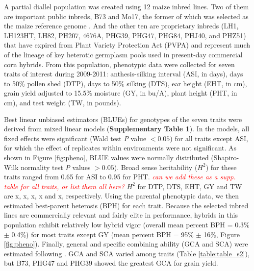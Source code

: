 \documentclass[twoside,twocolumn, letterpaper]{article}
\newcommand{\jri}[1]{\textcolor{red}{ \emph{ #1}} }
\begin{document}
A partial diallel population was created using 12 maize inbred lines. Two of them are important public inbreds, B73 and Mo17, the former of which was selected as the maize reference genome \citep{schnable2009b73}. And the other ten are proprietary inbreds (LH1, LH123HT, LH82, PH207, 4676A, PHG39, PHG47, PHG84, PHJ40, and PHZ51) that have expired from Plant Variety Protection Act (PVPA) \citep{nelson2008molecular} and represent much of the lineage of key heterotic germplasm pools used in present-day commercial corn hybrids.
From this population, phenotypic data were collected for seven traits of interest during 2009-2011: anthesis-silking interval (ASI, in days), days to 50\% pollen shed (DTP), days to 50\% silking (DTS), ear height (EHT, in cm), grain yield adjusted to 15.5\% moisture (GY, in bu/A), plant height (PHT, in cm), and test weight (TW, in pounds).

Best linear unbiased estimators (BLUEs) for genotypes of the seven traits were derived from mixed linear models (\textbf{Supplementary Table 1}).
In the models, all fixed effects were significant (Wald test \emph{P} value $<0.05$) for all traits except ASI, for which the effect of replicates within environments were not significant. 
As shown in Figure \ref{fig:pheno}, BLUE values were normally distributed (Shapiro-Wilk normality test \emph{P} values $>0.05$). 
Broad sense heritability ($H^2$) for these traits ranged from 0.65 for ASI to 0.95 for PHT. \jri{can we add these as a supp. table for all traits, or list them all here?} $H^2$ for DTP, DTS, EHT, GY and TW are x, x, x, x and x, respectively.
Using the parental phenotypic data, we then estimated best-parent heterosis (BPH) for each trait.  
Because the selected inbred lines are commercially relevant and fairly elite in performance, hybrids in this population exhibit relatively low hybrid vigor (overall mean percent BPH = 0.3\% $\pm$ 0.4\%) for most traits except GY (mean percent BPH = 95\% $\pm$ 16\%, Figure \ref{fig:pheno}). 
Finally, general and specific combining ability (GCA and SCA) were estimated following \citep{Falconer1996}. 
GCA and SCA varied among traits (Table \ref{table:table_s2}), but B73, PHG47 and PHG39 showed the greatest GCA for grain yield. 


\end{document}
